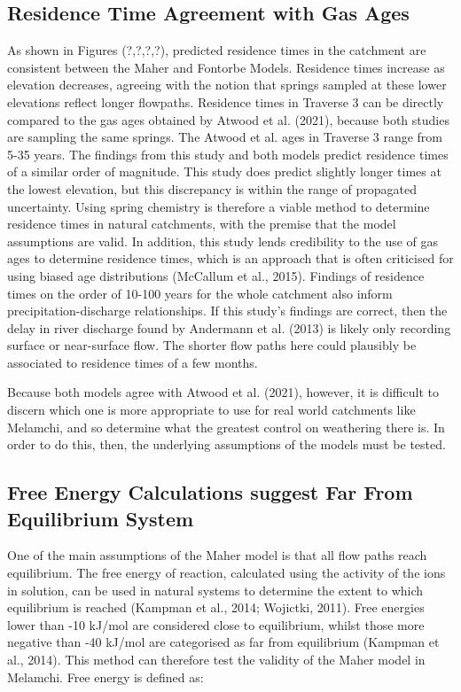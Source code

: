 \subsection{Residence Time Agreement with Gas Ages}

As shown in Figures (?,?,?,?), predicted residence times in the catchment are consistent between the Maher and Fontorbe Models. Residence times increase as elevation decreases, agreeing with the notion that springs sampled at these lower elevations reflect longer flowpaths. Residence times in Traverse 3 can be directly compared to the gas ages obtained by Atwood et al. (2021), because both studies are sampling the same springs. The Atwood et al. ages in Traverse 3 range from 5-35 years. The findings from this study and both models predict residence times of a similar order of magnitude. This study does predict slightly longer times at the lowest elevation, but this discrepancy is within the range of propagated uncertainty. Using spring chemistry is therefore a viable method to determine residence times in natural catchments, with the premise that the model assumptions are valid. In addition, this study lends credibility to the use of gas ages to determine residence times, which is an approach that is often criticised for using biased age distributions (McCallum et al., 2015). Findings of residence times on the order of 10-100 years for the whole catchment also inform precipitation-discharge relationships. If this study's findings are correct, then the delay in river discharge found by Andermann et al. (2013) is likely only recording surface or near-surface flow. The shorter flow paths here could plausibly be associated to residence times of a few months.

\bsk

Because both models agree with Atwood et al. (2021), however, it is difficult to discern which one is more appropriate to use for real world catchments like Melamchi, and so determine what the greatest control on weathering there is. In order to do this, then, the underlying assumptions of the models must be tested.


\newpage

\subsection{Free Energy Calculations suggest Far From Equilibrium System}

One of the main assumptions of the Maher model is that all flow paths reach equilibrium. The free energy of reaction, calculated using the activity of the ions in solution, can be used in natural systems to determine the extent to which equilibrium is reached (Kampman et al., 2014; Wojictki, 2011). Free energies lower than -10 kJ/mol are considered close to equilibrium, whilst those more negative than -40 kJ/mol are categorised as far from equilibrium (Kampman et al., 2014). This method can therefore test the validity of the Maher model in Melamchi. Free energy is defined as:

